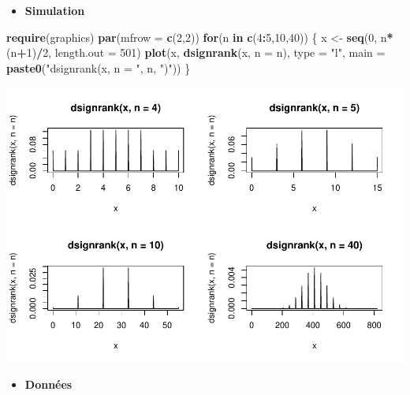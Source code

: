 \documentclass[
  12pt,
]{article}
\newenvironment{Shaded}{\begin{snugshade}}{\end{snugshade}}
\newcommand{\AttributeTok}[1]{\textcolor[rgb]{0.13,0.29,0.53}{#1}}
\newcommand{\ControlFlowTok}[1]{\textcolor[rgb]{0.13,0.29,0.53}{\textbf{#1}}}
\newcommand{\DecValTok}[1]{\textcolor[rgb]{0.00,0.00,0.81}{#1}}
\newcommand{\FunctionTok}[1]{\textcolor[rgb]{0.13,0.29,0.53}{\textbf{#1}}}
\newcommand{\NormalTok}[1]{#1}
\newcommand{\OtherTok}[1]{\textcolor[rgb]{0.56,0.35,0.01}{#1}}
\newcommand{\SpecialCharTok}[1]{\textcolor[rgb]{0.81,0.36,0.00}{\textbf{#1}}}
\newcommand{\StringTok}[1]{\textcolor[rgb]{0.31,0.60,0.02}{#1}}
\providecommand{\tightlist}{%
  \setlength{\itemsep}{0pt}\setlength{\parskip}{0pt}}
\begin{document}
\begin{itemize}
\tightlist
\item
  \textbf{Simulation}
\end{itemize}

\begin{Shaded}
\begin{Highlighting}[]
\FunctionTok{require}\NormalTok{(graphics)}
\FunctionTok{par}\NormalTok{(}\AttributeTok{mfrow =} \FunctionTok{c}\NormalTok{(}\DecValTok{2}\NormalTok{,}\DecValTok{2}\NormalTok{))}
\ControlFlowTok{for}\NormalTok{(n }\ControlFlowTok{in} \FunctionTok{c}\NormalTok{(}\DecValTok{4}\SpecialCharTok{:}\DecValTok{5}\NormalTok{,}\DecValTok{10}\NormalTok{,}\DecValTok{40}\NormalTok{)) \{}
\NormalTok{  x }\OtherTok{\textless{}{-}} \FunctionTok{seq}\NormalTok{(}\DecValTok{0}\NormalTok{, n}\SpecialCharTok{*}\NormalTok{(n}\SpecialCharTok{+}\DecValTok{1}\NormalTok{)}\SpecialCharTok{/}\DecValTok{2}\NormalTok{, }\AttributeTok{length.out =} \DecValTok{501}\NormalTok{)}
  \FunctionTok{plot}\NormalTok{(x, }\FunctionTok{dsignrank}\NormalTok{(x, }\AttributeTok{n =}\NormalTok{ n), }\AttributeTok{type =} \StringTok{"l"}\NormalTok{,}
       \AttributeTok{main =} \FunctionTok{paste0}\NormalTok{(}\StringTok{"dsignrank(x, n = "}\NormalTok{, n, }\StringTok{")"}\NormalTok{))}
\NormalTok{\}}
\end{Highlighting}
\end{Shaded}

\includegraphics{Stat_non_para_files/figure-latex/unnamed-chunk-69-1.pdf}

\begin{itemize}
\tightlist
\item
  \textbf{Données}
\end{itemize}
\end{document}
